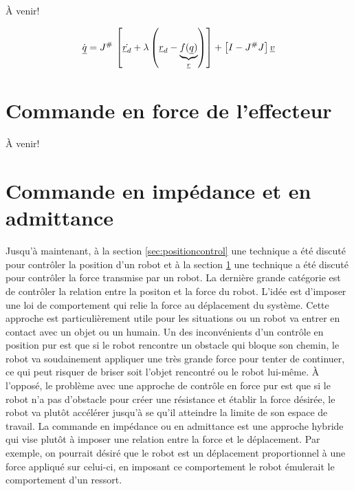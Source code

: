 À venir!

\begin{align}
\dot{\underline{q}} = J^{\#} \, \left[ \dot{\underline{r}_d} + \lambda \left( \underline{r}_d  - \underbrace{f(\underline{q})}_{\underline{r}}  \right)\right]  + \left[ I - J^{\#}J  \right] \underline{v}
\end{align}



\newpage
\section{Commande en force de l'effecteur}
\label{sec:forcecontrol}

À venir!




\newpage
\section{Commande en impédance et en admittance}
\label{sec:impcontrol}

Jusqu'à maintenant, à la section \ref{sec:positioncontrol} une technique a été discuté pour contrôler la position d'un robot et à la section \ref{sec:forcecontrol} une technique a été discuté pour contrôler la force transmise par un robot. La dernière grande catégorie est de contrôler la relation entre la positon et la force du robot. L'idée est d'imposer une loi de comportement qui relie la force au déplacement du système. Cette approche est particulièrement utile pour les situations ou un robot va entrer en contact avec un objet ou un humain. Un des inconvénients d'un contrôle en position pur est que si le robot rencontre un obstacle qui bloque son chemin, le robot va soudainement appliquer une très grande force pour tenter de continuer, ce qui peut risquer de briser soit l'objet rencontré ou le robot lui-même. À l'opposé, le problème avec une approche de contrôle en force pur est que si le robot n'a pas d'obstacle pour créer une résistance et établir la force désirée, le robot va plutôt accélérer jusqu'à se qu'il atteindre la limite de son espace de travail. La commande en impédance ou en admittance est une approche hybride qui vise plutôt à imposer une relation entre la force et le déplacement. Par exemple, on pourrait désiré que le robot est un déplacement proportionnel à une force appliqué sur celui-ci, en imposant ce comportement le robot émulerait le comportement d'un ressort. 

